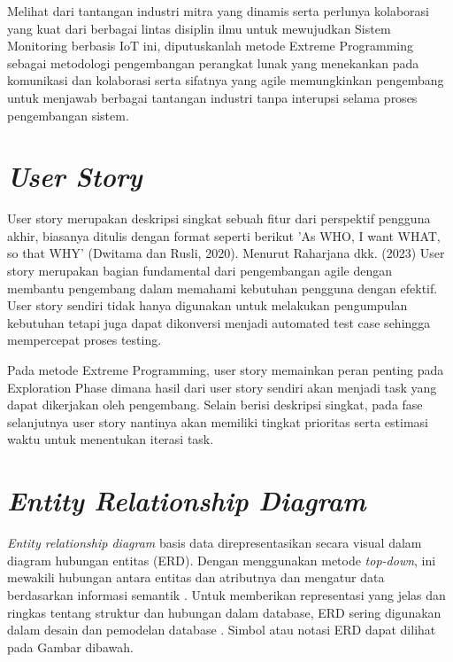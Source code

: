 Melihat dari tantangan industri mitra yang dinamis serta perlunya kolaborasi yang kuat dari berbagai lintas disiplin ilmu untuk mewujudkan Sistem Monitoring berbasis IoT ini, diputuskanlah metode Extreme Programming sebagai metodologi pengembangan perangkat lunak yang menekankan pada komunikasi dan kolaborasi serta sifatnya yang agile memungkinkan pengembang untuk menjawab berbagai tantangan industri tanpa interupsi selama proses pengembangan sistem.

\section{\textit{User Story}}

User story merupakan deskripsi singkat sebuah fitur dari perspektif pengguna akhir, biasanya ditulis dengan format seperti berikut 'As WHO, I want WHAT, so that WHY' (Dwitama dan Rusli, 2020).  Menurut Raharjana dkk. (2023) User story merupakan bagian fundamental dari pengembangan agile dengan membantu pengembang dalam memahami kebutuhan pengguna dengan efektif. User story sendiri tidak hanya digunakan untuk melakukan pengumpulan kebutuhan tetapi juga dapat dikonversi menjadi automated test case sehingga mempercepat proses testing.

Pada metode Extreme Programming, user story memainkan peran penting pada Exploration Phase dimana hasil dari user story sendiri akan menjadi task yang dapat dikerjakan oleh pengembang. Selain berisi deskripsi singkat, pada fase selanjutnya user story nantinya akan memiliki tingkat prioritas serta estimasi waktu untuk menentukan iterasi task.

\section{\textit{Entity Relationship Diagram}}

\textit{Entity relationship diagram} basis data direpresentasikan secara visual dalam diagram hubungan entitas (ERD). Dengan menggunakan metode \textit{top-down}, ini mewakili hubungan antara entitas dan atributnya dan mengatur data berdasarkan informasi semantik \parencite{article:chen}. Untuk memberikan representasi yang jelas dan ringkas tentang struktur dan hubungan dalam database, ERD sering digunakan dalam desain dan pemodelan database \parencite{article:supriyadi}. Simbol atau notasi ERD dapat dilihat pada Gambar dibawah.

